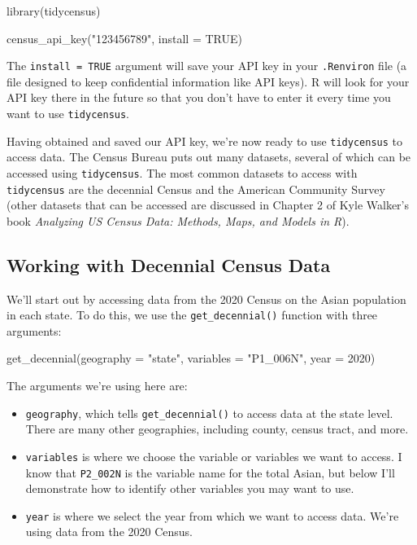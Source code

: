 \documentclass[
]{book}
\newenvironment{Shaded}{\begin{snugshade}}{\end{snugshade}}
\newcommand{\AttributeTok}[1]{\textcolor[rgb]{0.77,0.63,0.00}{#1}}
\newcommand{\ConstantTok}[1]{\textcolor[rgb]{0.00,0.00,0.00}{#1}}
\newcommand{\DecValTok}[1]{\textcolor[rgb]{0.00,0.00,0.81}{#1}}
\newcommand{\FunctionTok}[1]{\textcolor[rgb]{0.00,0.00,0.00}{#1}}
\newcommand{\NormalTok}[1]{#1}
\newcommand{\StringTok}[1]{\textcolor[rgb]{0.31,0.60,0.02}{#1}}
\providecommand{\tightlist}{%
  \setlength{\itemsep}{0pt}\setlength{\parskip}{0pt}}
\begin{document}
\begin{Shaded}
\begin{Highlighting}[]
\FunctionTok{library}\NormalTok{(tidycensus)}

\FunctionTok{census\_api\_key}\NormalTok{(}\StringTok{"123456789"}\NormalTok{, }\AttributeTok{install =} \ConstantTok{TRUE}\NormalTok{)}
\end{Highlighting}
\end{Shaded}

The \texttt{install\ =\ TRUE} argument will save your API key in your \texttt{.Renviron} file (a file designed to keep confidential information like API keys). R will look for your API key there in the future so that you don't have to enter it every time you want to use \texttt{tidycensus}.

Having obtained and saved our API key, we're now ready to use \texttt{tidycensus} to access data. The Census Bureau puts out many datasets, several of which can be accessed using \texttt{tidycensus}. The most common datasets to access with \texttt{tidycensus} are the decennial Census and the American Community Survey (other datasets that can be accessed are discussed in Chapter 2 of Kyle Walker's book \emph{Analyzing US Census Data: Methods, Maps, and Models in R}).

\hypertarget{working-with-decennial-census-data}{%
\subsection*{Working with Decennial Census Data}\label{working-with-decennial-census-data}}

We'll start out by accessing data from the 2020 Census on the Asian population in each state. To do this, we use the \texttt{get\_decennial()} function with three arguments:

\begin{Shaded}
\begin{Highlighting}[]
\FunctionTok{get\_decennial}\NormalTok{(}\AttributeTok{geography =} \StringTok{"state"}\NormalTok{, }
              \AttributeTok{variables =} \StringTok{"P1\_006N"}\NormalTok{,}
              \AttributeTok{year =} \DecValTok{2020}\NormalTok{)}
\end{Highlighting}
\end{Shaded}

The arguments we're using here are:

\begin{itemize}
\tightlist
\item
  \texttt{geography}, which tells \texttt{get\_decennial()} to access data at the state level. There are many other geographies, including county, census tract, and more.
\item
  \texttt{variables} is where we choose the variable or variables we want to access. I know that \texttt{P2\_002N} is the variable name for the total Asian, but below I'll demonstrate how to identify other variables you may want to use.
\item
  \texttt{year} is where we select the year from which we want to access data. We're using data from the 2020 Census.
\end{itemize}
\end{document}
